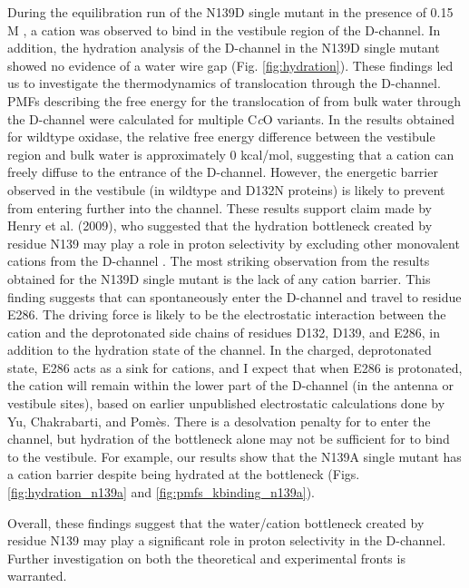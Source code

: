 During the equilibration run of the N139D single mutant in the presence of 0.15 M , a  cation was observed to bind in the vestibule region of the D-channel. In addition, the hydration analysis of the D-channel in the N139D single mutant showed no evidence of a water wire gap (Fig. \ref{fig:hydration}). These findings led us to investigate the thermodynamics of  translocation through the D-channel. PMFs describing the free energy for the translocation of  from bulk water through the D-channel were calculated for multiple C\emph{c}O variants. In the results obtained for wildtype oxidase, the relative free energy difference between the vestibule region and bulk water is approximately 0 kcal/mol, suggesting that a  cation can freely diffuse to the entrance of the D-channel. However, the energetic barrier observed in the vestibule (in wildtype and D132N proteins) is likely to prevent  from entering further into the channel. These results support claim made by Henry et al. (2009), who suggested that the hydration bottleneck created by residue N139 may play a role in proton selectivity by excluding other monovalent cations from the D-channel \cite{Henry:2009p4543}. The most striking observation from the results obtained for the N139D single mutant is the lack of any cation barrier. This finding suggests that  can spontaneously enter the D-channel and travel to residue E286. The driving force is likely to be the electrostatic interaction between the cation and the deprotonated side chains of residues D132, D139, and E286, in addition to the hydration state of the channel. In the charged, deprotonated state, E286 acts as a sink for cations, and I expect that when E286 is protonated, the cation will remain within the lower part of the D-channel (in the antenna or vestibule sites), based on earlier unpublished electrostatic calculations done by Yu, Chakrabarti, and Pomès. There is a desolvation penalty for  to enter the channel, but hydration of the bottleneck alone may not be sufficient for  to bind to the vestibule. For example, our results show that the N139A single mutant has a cation barrier despite being hydrated at the bottleneck (Figs. \ref{fig:hydration_n139a} and \ref{fig:pmfs_kbinding_n139a}). 

Overall, these findings suggest that the water/cation bottleneck created by residue N139 may play a significant role in proton selectivity in the D-channel. Further investigation on both the theoretical and experimental fronts is warranted.

